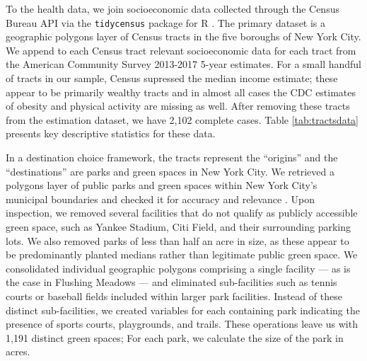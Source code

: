 \documentclass[shortAfour,sageh.bst]{sagej}
\begin{document}
To the health data, we join socioeconomic data collected through the
Census Bureau API via the \texttt{tidycensus} package for R
\citep{Walker2019}. The primary dataset is a geographic polygons layer
of Census tracts in the five boroughs of New York City. We append to
each Census tract relevant socioeconomic data for each tract from the
American Community Survey 2013-2017 5-year estimates. For a small
handful of tracts in our sample, Census supressed the median income
estimate; these appear to be primarily wealthy tracts and in almost all
cases the CDC estimates of obesity and physical activity are missing as
well. After removing these tracts from the estimation dataset, we have
2,102 complete cases. Table \ref{tab:tractsdata} presents key
descriptive statistics for these data.

In a destination choice framework, the tracts represent the ``origins''
and the ``destinations'' are parks and green spaces in New York City. We
retrieved a polygons layer of public parks and green spaces within New
York City's municipal boundaries and checked it for accuracy and
relevance \citep{nycparks}. Upon inspection, we removed several
facilities that do not qualify as publicly accessible green space, such
as Yankee Stadium, Citi Field, and their surrounding parking lots. We
also removed parks of less than half an acre in size, as these appear to
be predominantly planted medians rather than legitimate public green
space. We consolidated individual geographic polygons comprising a
single facility --- as is the case in Flushing Meadows --- and
eliminated sub-facilities such as tennis courts or baseball fields
included within larger park facilities. Instead of these distinct
sub-facilities, we created variables for each containing park indicating
the presence of sports courts, playgrounds, and trails. These operations
leave us with 1,191 distinct green spaces; For each park, we calculate
the size of the park in acres.
\end{document}
